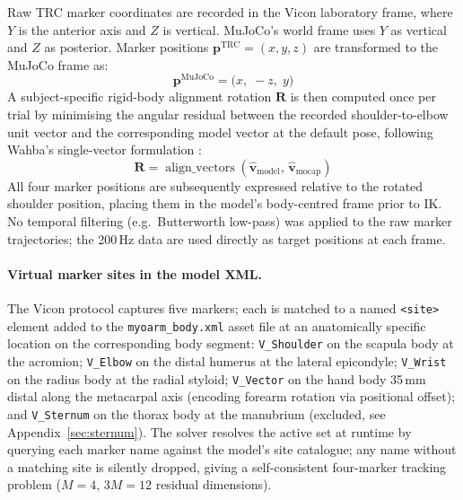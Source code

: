 \documentclass[journal,10pt,twocolumn]{IEEEtran}
\begin{document}
Raw TRC marker coordinates are recorded in the Vicon laboratory frame,
where $Y$ is the anterior axis and $Z$ is vertical. MuJoCo's world frame
uses $Y$ as vertical and $Z$ as posterior. Marker positions
$\mathbf{p}^{\text{TRC}} = (x, y, z)$ are transformed to the MuJoCo frame
as:
\begin{equation}
  \mathbf{p}^{\text{MuJoCo}} = \bigl(x,\; -z,\; y\bigr)
  \label{eq:frame_transform}
\end{equation}
A subject-specific rigid-body alignment rotation $\mathbf{R}$ is then
computed once per trial by minimising the angular residual between the
recorded shoulder-to-elbow unit vector and the corresponding model vector
at the default pose, following Wahba's single-vector formulation
\cite{wahba1965}:
\begin{equation}
  \mathbf{R} = \operatorname{align\_vectors}
               \!\left(\hat{\mathbf{v}}_{\text{model}},\,
                       \hat{\mathbf{v}}_{\text{mocap}}\right)
  \label{eq:wahba}
\end{equation}
All four marker positions are subsequently expressed relative to the
rotated shoulder position, placing them in the model's body-centred frame
prior to IK. No temporal filtering (e.g.\ Butterworth low-pass) was applied
to the raw marker trajectories; the 200\,Hz data are used directly as target
positions at each frame.

\paragraph{Virtual marker sites in the model XML.}
The Vicon protocol captures five markers; each is matched to a named
\texttt{<site>} element added to the \texttt{myoarm\_body.xml} asset file
at an anatomically specific location on the corresponding body segment:
\texttt{V\_Shoulder} on the scapula body at the acromion;
\texttt{V\_Elbow} on the distal humerus at the lateral epicondyle;
\texttt{V\_Wrist} on the radius body at the radial styloid;
\texttt{V\_Vector} on the hand body 35\,mm distal along the metacarpal
axis (encoding forearm rotation via positional offset); and
\texttt{V\_Sternum} on the thorax body at the manubrium (excluded, see
Appendix~\ref{sec:sternum}).
The solver resolves the active set at runtime by querying each marker name
against the model's site catalogue; any name without a matching site is
silently dropped, giving a self-consistent four-marker tracking problem
($M{=}4$, $3M{=}12$ residual dimensions).
\end{document}
